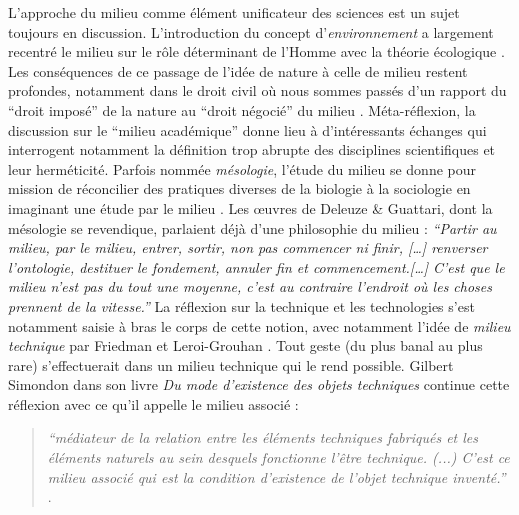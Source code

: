 L’approche du milieu comme élément unificateur des sciences est un sujet toujours en discussion. L’introduction du concept d’\textit{environnement} a largement recentré le milieu sur le rôle déterminant de l’Homme avec  la théorie écologique \citep{Gandolfo2008}. Les conséquences de ce passage de l’idée de nature à celle de milieu restent profondes, notamment dans le droit civil où nous sommes passés d’un rapport du ``droit imposé'' de la nature au ``droit négocié'' du milieu \citep{Papaux2008}. Méta-réflexion, la discussion sur le ``milieu académique'' donne lieu à d’intéressants échanges \citep{Stengers2009} qui interrogent notamment la définition trop abrupte des disciplines scientifiques et leur herméticité. Parfois nommée \textit{mésologie}, l’étude du milieu se donne pour mission de réconcilier des pratiques diverses de la biologie à la sociologie en imaginant une étude par le milieu \citep{Stengers2003}. Les œuvres de Deleuze \& Guattari, dont la mésologie se revendique, parlaient déjà d’une philosophie du milieu : \textit{``Partir au milieu, par le milieu, entrer, sortir, non pas commencer ni finir, […] renverser l'ontologie, destituer le fondement, annuler fin et commencement.[…] C'est que le milieu n'est pas du tout une moyenne, c'est au contraire l'endroit où les choses prennent de la vitesse.''} \citep{Deleuze1972} 
La réflexion sur la technique et les technologies s’est notamment saisie à bras le corps de cette notion, avec notamment l’idée de \textit{milieu technique} par Friedman et Leroi-Grouhan \citep{Stiegler1998}. Tout geste (du plus banal au plus rare) s’effectuerait dans un milieu technique qui le rend possible. Gilbert Simondon dans son livre \textit{Du mode d’existence des objets techniques} continue cette réflexion avec ce qu’il appelle le milieu associé : 

\begin{quote}
    \textit{``médiateur de la relation entre les éléments techniques fabriqués et les éléments  naturels au sein desquels fonctionne l’être technique. (...) C’est ce milieu associé    qui est la condition d’existence de l’objet technique inventé.''} \citep{Simondon1989}. 
\end{quote}

